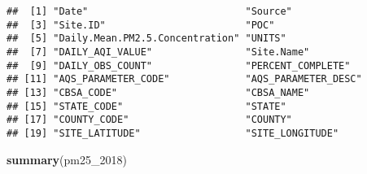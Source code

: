 \documentclass[]{article}
\newenvironment{Shaded}{\begin{snugshade}}{\end{snugshade}}
\newcommand{\KeywordTok}[1]{\textcolor[rgb]{0.13,0.29,0.53}{\textbf{#1}}}
\newcommand{\DecValTok}[1]{\textcolor[rgb]{0.00,0.00,0.81}{#1}}
\newcommand{\NormalTok}[1]{#1}
\begin{document}
\begin{verbatim}
##  [1] "Date"                           "Source"                        
##  [3] "Site.ID"                        "POC"                           
##  [5] "Daily.Mean.PM2.5.Concentration" "UNITS"                         
##  [7] "DAILY_AQI_VALUE"                "Site.Name"                     
##  [9] "DAILY_OBS_COUNT"                "PERCENT_COMPLETE"              
## [11] "AQS_PARAMETER_CODE"             "AQS_PARAMETER_DESC"            
## [13] "CBSA_CODE"                      "CBSA_NAME"                     
## [15] "STATE_CODE"                     "STATE"                         
## [17] "COUNTY_CODE"                    "COUNTY"                        
## [19] "SITE_LATITUDE"                  "SITE_LONGITUDE"
\end{verbatim}

\begin{Shaded}
\begin{Highlighting}[]
\KeywordTok{summary}\NormalTok{(pm25_}\DecValTok{2018}\NormalTok{)}
\end{Highlighting}
\end{Shaded}
\end{document}
